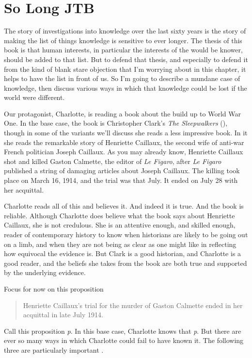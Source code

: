 \documentclass[
  10pt,
  letterpaper,
  twoside]{scrbook}
\begin{document}
\section{So Long JTB}\label{sec-gettier}

The story of investigations into knowledge over the last sixty years is
the story of making the list of things knowledge is sensitive to ever
longer. The thesis of this book is that human interests, in particular
the interests of the would be knower, should be added to that list. But
to defend that thesis, and especially to defend it from the kind of
blank stare objection that I'm worrying about in this chapter, it helps
to have the list in front of us. So I'm going to describe a mundane case
of knowledge, then discuss various ways in which that knowledge could be
lost if the world were different.

Our protagonist, Charlotte, is reading a book about the build up to
World War One. In the base case, the book is Christopher Clark's
\emph{The Sleepwalkers} (), though
in some of the variants we'll discuss she reads a less impressive book.
In it she reads the remarkable story of Henriette Caillaux, the second
wife of anti-war French politician Joseph Caillaux. As you may already
know, Henriette Caillaux shot and killed Gaston Calmette, the editor of
\emph{Le Figaro}, after \emph{Le Figaro} published a string of damaging
articles about Joseph Caillaux. The killing took place on March 16,
1914, and the trial was that July. It ended on July 28 with her
acquittal.

Charlotte reads all of this and believes it. And indeed it is true. And
the book is reliable. Although Charlotte does believe what the book says
about Henriette Caillaux, she is not credulous. She is an attentive
enough, and skilled enough, reader of contemporary history to know when
historians are likely to be going out on a limb, and when they are not
being as clear as one might like in reflecting how equivocal the
evidence is. But Clark is a good historian, and Charlotte is a good
reader, and the beliefs she takes from the book are both true and
supported by the underlying evidence.

Focus for now on this proposition

\begin{quote}
Henriette Caillaux's trial for the murder of Gaston Calmette ended in
her acquittal in late July 1914.
\end{quote}

Call this proposition \emph{p}. In this base case, Charlotte knows that
\emph{p}. But there are ever so many ways in which Charlotte could fail
to have known it. The following three are particularly important .
\end{document}
